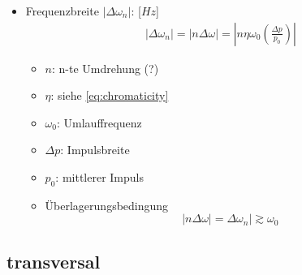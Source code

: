 \documentclass[12pt]{article}%
\newcommand{\itemf}{\item[$\circ$]}
\begin{document}
\begin{itemize}
\item Frequenzbreite $|\Delta \omega_n|$: [$Hz$]
\begin{align}
	|\Delta \omega_n| = | n \Delta \omega| = |n \eta \omega_0 \left(\frac{\Delta p}{p_0}\right)|
\end{align}
\begin{itemize}
	\item $n$: n-te Umdrehung (?)
	\item $\eta$: siehe \eqref{eq:chromaticity}
	\item $\omega_0$: Umlauffrequenz
	\item $\Delta p$: Impulsbreite
	\item $p_0$: mittlerer Impuls
\end{itemize}
\begin{itemize}
\itemf Überlagerungsbedingung \[ |n\Delta \omega| = \Delta \omega_n| \gtrsim \omega_0 \]
\end{itemize}

\end{itemize}

\subsection{transversal}
\end{document}

